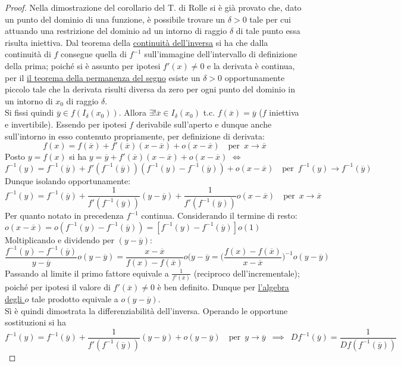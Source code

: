 \documentclass[10pt]{article}
\theoremstyle{plain}
\begin{document}
\begin{proof}
Nella dimostrazione del corollario del T. di Rolle si è già provato che, dato un punto del dominio di una funzione, è possibile trovare un $\delta > 0$ tale per cui attuando una restrizione del dominio ad un intorno di raggio $\delta$ di tale punto essa risulta iniettiva. Dal teorema della \hyperlink{inversa}{continuità dell'inversa} si ha che dalla continuità di $f$ consegue quella di $f^{-1}$ sull'immagine dell'intervallo di definizione della prima; poiché si è assunto per ipotesi $f'(x) \neq 0$ e la derivata è continua, per il \hyperref[subsubsec:perman]{il teorema della permanenza del segno} esiste un $\delta > 0$ opportunamente piccolo tale che la derivata risulti diversa da zero per ogni punto del dominio in un intorno di $x_0$ di raggio $\delta$. \\
Si fissi quindi $\overline{y} \in f(I_\delta(x_0))$. Allora $\exists! \overline{x} \in I_\delta(x_0)$ t.c. $f(\overline{x}) = \overline{y}$ ($f$ iniettiva e invertibile). Essendo per ipotesi $f$ derivabile sull'aperto e dunque anche sull'intorno in esso contenuto propriamente, per definizione di derivata:
\[f(x) = f(\overline{x}) + f'(\overline{x}) (x - \overline{x}) + o (x - \overline{x}) \quad \textrm{per} \enspace x \rightarrow \overline{x}\]
Posto $y = f(x)$ si ha $y = \overline{y} + f'(\overline{x}) (x - \overline{x}) + o (x - \overline{x})$ $\Leftrightarrow$ $f^{-1}(y) = f^{-1}(\overline{y}) + f'(f^{-1}(\overline{y})) (f^{-1}(y) - f^{-1}(\overline{y})) + o (x - \overline{x}) \quad \textrm{per} \enspace f^{-1}(y) \rightarrow f^{-1}(\overline{y})$
\\Dunque isolando opportunamente:
\[f^{-1}(y) = f^{-1}(\overline{y}) + \frac{1}{f'(f^{-1}(\overline{y}))}(y - \overline{y}) + \frac{1}{f'(f^{-1}(\overline{y}))} o(x - \overline{x}) \quad \textrm{per} \enspace x \rightarrow \overline{x}\]
Per quanto notato in precedenza $f^{-1}$ continua. Considerando il termine di resto: $o(x - \overline{x}) = o (f^{-1}(y) - f^{-1}(\overline{y})) = [f^{-1}(y) - f^{-1}(\overline{y})]o(1)$
\hypertarget{cus}{Moltiplicando e dividendo} per $(y - \overline{y})$:
\[\frac{f^{-1}(y) - f^{-1}(\overline{y})}{y - \overline{y}} o(y - \overline{y}) = \frac{x - \overline{x}}{f(x) - f(\overline{x})}o(y - \overline{y} = \bigg(\frac{f(x) - f(\overline{x})}{x - \overline{x}}\bigg)^{-1}o(y - \overline{y})\]
Passando al limite il primo fattore equivale a $\frac{1}{f'(\overline{x})}$ (reciproco dell'incrementale); poiché per ipotesi il valore di $f'(\overline{x}) \neq 0$ è ben definito. Dunque per \hyperlink{opiccoli}{l'algebra degli $o$} tale prodotto equivale a $o(y - \overline{y})$.
\\Sì è quindi dimostrata la differenziabilità dell'inversa. Operando le opportune sostituzioni si ha
\[f^{-1}(y) = f^{-1}(\overline{y}) + \frac{1}{f'(f^{-1}(\overline{y}))}(y - \overline{y}) + o(y - \overline{y}) \quad \textrm{per} \enspace y \rightarrow \overline{y} \enspace \implies \enspace Df^{-1}(\overline{y}) = \frac{1}{Df(f^{-1}(\overline{y}))}\]
\end{proof}
\end{document}
